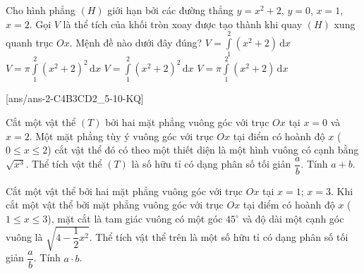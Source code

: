 \begin{ex}%
	Cho hình phẳng $(H)$ giới hạn bởi các đường thẳng $y=x^2+2$, $y=0$, $x=1$, $x=2$. Gọi $V$ là thể tích của khối tròn xoay được tạo thành khi quay $(H)$ xung quanh trục $Ox$. Mệnh đề nào dưới đây đúng?
	\choice
	{$V=\displaystyle\int\limits_1^2\left(x^2+2\right)\mathrm{\,d}x$}
	{\True $V=\pi\displaystyle\int\limits_1^2\left(x^2+2\right)^2\mathrm{\,d}x$}
	{$V=\displaystyle\int\limits_1^2\left(x^2+2\right)^2\mathrm{\,d}x$}
	{$V=\pi\displaystyle\int\limits_1^2\left(x^2+2\right)\mathrm{\,d}x$}
\end{ex}

[ans/ans-2-C4B3CD2_5-10-KQ]

\begin{ex}%
	Cắt một vật thể $(T)$ bởi hai mặt phẳng vuông góc với trục $Ox$ tại $x=0$ và $x=2$. Một mặt phẳng tùy ý vuông góc với trục $Ox$ tại điểm có hoành độ $x$ ($0\le x\le 2$) cắt vật thể đó có theo một thiết diện là một hình vuông có cạnh bằng $\sqrt{x^3}$. Thể tích vật thể $(T)$ là số hữu tỉ có dạng phân số tối giản $\dfrac{a}{b}$. Tính $a+b$.
\end{ex}

\begin{ex}%
	Cắt một vật thể bởi hai mặt phẳng vuông góc với trục $Ox$ tại $x=1$; $x=3$. Khi cắt một vật thể bởi mặt phẳng vuông góc với trục $Ox$ tại điểm có hoành độ $x$ ($1\le x\le 3$), mặt cắt là tam giác vuông có một góc $45^\circ$ và độ dài một cạnh góc vuông là $\sqrt{4-\dfrac{1}{2} x^2}$. Thể tích vật thể trên là một số hữu tỉ có dạng phân số tối giản $\dfrac{a}{b}$. Tính $a\cdot b$.
\end{ex}

